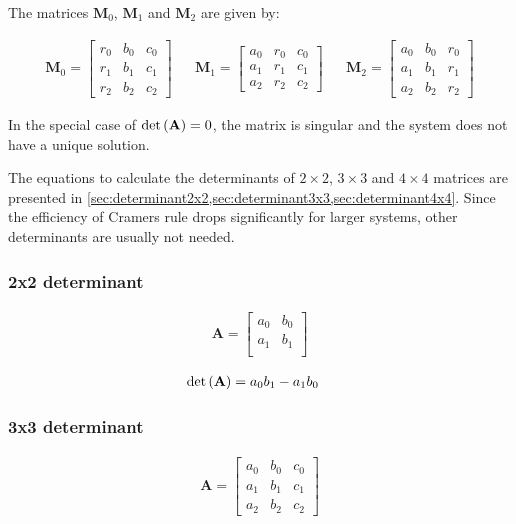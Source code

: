 The matrices $\mathbf{M}_0$, $\mathbf{M}_1$ and $\mathbf{M}_2$ are given by:

\begin{align*}
\mathbf{M}_0
=
\begin{bmatrix}
r_0&b_0&c_0\\
r_1&b_1&c_1\\
r_2&b_2&c_2
\end{bmatrix}
&&
\mathbf{M}_1
=
\begin{bmatrix}
a_0&r_0&c_0\\
a_1&r_1&c_1\\
a_2&r_2&c_2
\end{bmatrix}
&&
\mathbf{M}_2
=
\begin{bmatrix}
a_0&b_0&r_0\\
a_1&b_1&r_1\\
a_2&b_2&r_2
\end{bmatrix}
\end{align*}

In the special case of $\mathrm{det}\left(\mathbf{A}\right) = 0$, the matrix is singular and the system does not have a unique solution.

The equations to calculate the determinants of $2 \times 2$, $3 \times 3$ and $4 \times 4$ matrices are presented in \cref {sec:determinant2x2,sec:determinant3x3,sec:determinant4x4}.
Since the efficiency of Cramers rule drops significantly for larger systems, other determinants are usually not needed. 




\subsubsection{2x2 determinant}
\label{sec:determinant2x2}

\begin{align*}
\mathbf{A}
=
\begin{bmatrix}
a_0&b_0\\
a_1&b_1\\
\end{bmatrix}
\end{align*}

\begin{align*}
\mathrm{det}\left(\mathbf{A}\right)
&
= a_0b_1 - a_1b_0
\end{align*}

\subsubsection{3x3 determinant}
\label{sec:determinant3x3}
\begin{align*}
\mathbf{A}
=
\begin{bmatrix}
a_0&b_0&c_0\\
a_1&b_1&c_1\\
a_2&b_2&c_2
\end{bmatrix}
\end{align*}


